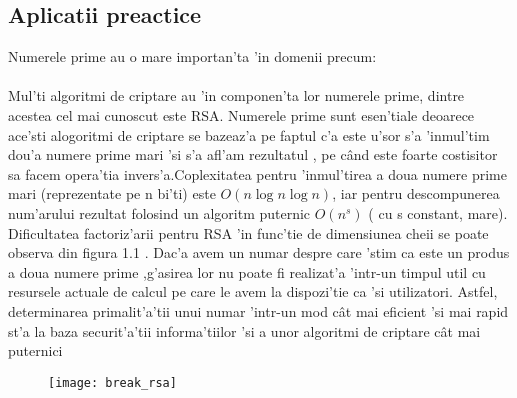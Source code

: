 \documentclass[12pt,twoside]{article}
\numberwithin{figure}{section}
\begin{document}
\subsection{Aplicatii preactice}
Numerele prime au o mare importan'ta 'in domenii precum:

\begin{description}[font=$\bullet$~\normalfont\scshape\color{black!50!black}]
\item [Criptografia]
\end{description}
\paragraph{}
Mul'ti algoritmi de criptare au 'in componen'ta lor numerele prime, dintre acestea cel mai cunoscut este RSA.
Numerele prime sunt esen'tiale deoarece ace'sti alogoritmi de criptare se bazeaz'a pe faptul c'a este u'sor s'a 'inmul'tim dou'a numere prime mari 'si s'a afl'am rezultatul , pe c\^and este foarte costisitor sa facem opera'tia invers'a.Coplexitatea pentru 'inmul'tirea a doua numere prime mari (reprezentate pe n bi'ti) este $O(n \log n \log n)$, iar pentru  descompunerea num'arului rezultat folosind un algoritm puternic
$ O(n^s)$ ( cu s constant, mare). Dificultatea factoriz'arii  pentru RSA 'in func'tie de dimensiunea cheii se poate observa din figura 1.1 . Dac'a avem un numar despre care 'stim ca este un produs a doua numere prime ,g'asirea lor nu poate fi realizat'a 'intr-un timpul util cu resursele actuale de calcul pe care le avem la dispozi'tie ca 'si utilizatori. Astfel, determinarea primalit'a'tii unui numar 'intr-un mod c\^at mai eficient 'si mai rapid st'a la baza securit'a'tii informa'tiilor 'si a unor algoritmi de criptare c\^at mai puternici

\begin{figure}[!htb]
\centering

\texttt{[image: break\_rsa]}


\caption{}
     
\end{figure}

\newpage
\begin{description}[font=$\bullet$~\normalfont\scshape\color{black!50!black}]
\item [Generarea numerelor pseudoaleatoare]
\end{description}


\begin{description}[font=$\bullet$~\normalfont\scshape\color{black!50!black}]
\item [Tabele de dispersie]
\end{description}
\end{document}
